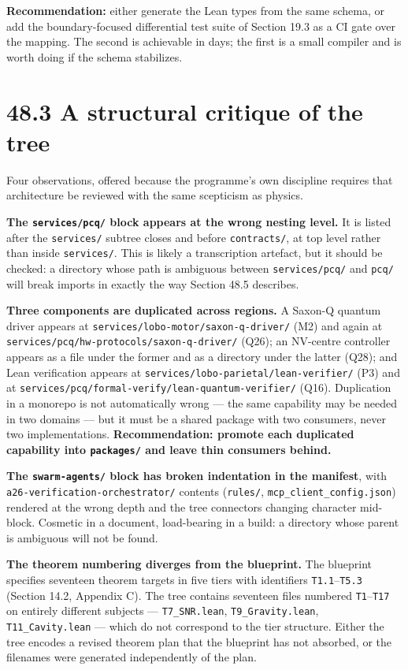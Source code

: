\documentclass[
  11pt]{report}
\begin{document}
\textbf{Recommendation:} either generate the Lean types from the same
schema, or add the boundary-focused differential test suite of Section
19.3 as a CI gate over the mapping. The second is achievable in days;
the first is a small compiler and is worth doing if the schema
stabilizes.

\hypertarget{a-structural-critique-of-the-tree}{%
\section{48.3 A structural critique of the
tree}\label{a-structural-critique-of-the-tree}}

Four observations, offered because the programme's own discipline
requires that architecture be reviewed with the same scepticism as
physics.

\textbf{The \texttt{services/pcq/} block appears at the wrong nesting
level.} It is listed after the \texttt{services/} subtree closes and
before \texttt{contracts/}, at top level rather than inside
\texttt{services/}. This is likely a transcription artefact, but it
should be checked: a directory whose path is ambiguous between
\texttt{services/pcq/} and \texttt{pcq/} will break imports in exactly
the way Section 48.5 describes.

\textbf{Three components are duplicated across regions.} A Saxon-Q
quantum driver appears at \texttt{services/lobo-motor/saxon-q-driver/}
(M2) and again at \texttt{services/pcq/hw-protocols/saxon-q-driver/}
(Q26); an NV-centre controller appears as a file under the former and as
a directory under the latter (Q28); and Lean verification appears at
\texttt{services/lobo-parietal/lean-verifier/} (P3) and at
\texttt{services/pcq/formal-verify/lean-quantum-verifier/} (Q16).
Duplication in a monorepo is not automatically wrong --- the same
capability may be needed in two domains --- but it must be a shared
package with two consumers, never two implementations.
\textbf{Recommendation: promote each duplicated capability into
\texttt{packages/} and leave thin consumers behind.}

\textbf{The \texttt{swarm-agents/} block has broken indentation in the
manifest}, with \texttt{a26-verification-orchestrator/} contents
(\texttt{rules/}, \texttt{mcp\_client\_config.json}) rendered at the
wrong depth and the tree connectors changing character mid-block.
Cosmetic in a document, load-bearing in a build: a directory whose
parent is ambiguous will not be found.

\textbf{The theorem numbering diverges from the blueprint.} The
blueprint specifies seventeen theorem targets in five tiers with
identifiers \texttt{T1.1}--\texttt{T5.3} (Section 14.2, Appendix C). The
tree contains seventeen files numbered \texttt{T1}--\texttt{T17} on
entirely different subjects --- \texttt{T7\_SNR.lean},
\texttt{T9\_Gravity.lean}, \texttt{T11\_Cavity.lean} --- which do not
correspond to the tier structure. Either the tree encodes a revised
theorem plan that the blueprint has not absorbed, or the filenames were
generated independently of the plan.
\end{document}
